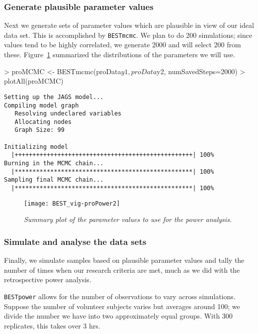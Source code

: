 \documentclass[a4paper]{article}
\begin{document}
\subsubsection{Generate plausible parameter values}
\label{subsec:proPower2}

Next we generate sets of parameter values which are plausible in view of our ideal data set. This is accomplished by \texttt{BESTmcmc}. We plan to do 200 simulations; since values tend to be highly correlated, we generate 2000 and will select 200 from these. Figure~\ref{fig:proPower2} summarized the distributions of the parameters we will use.

\begin{Schunk}
\begin{Sinput}
> proMCMC <- BESTmcmc(proData$y1, proData$y2, numSavedSteps=2000)  
> plotAll(proMCMC)
\end{Sinput}
\end{Schunk}
\begin{verbatim}
Setting up the JAGS model...
Compiling model graph
   Resolving undeclared variables
   Allocating nodes
   Graph Size: 99

Initializing model
  |++++++++++++++++++++++++++++++++++++++++++++++++++| 100%
Burning in the MCMC chain...
  |**************************************************| 100%
Sampling final MCMC chain...
  |**************************************************| 100%
\end{verbatim}
\begin{figure}[p]
  \centering
  \texttt{[image: BEST\_vig-proPower2]}
  \caption{\it Summary plot of the parameter values to use for the power analysis.}
  \label{fig:proPower2}
\end{figure}

\subsubsection{Simulate and analyse the data sets}
\label{subsec:proPower3}

Finally, we simulate samples based on plausible parameter values and tally the number of times when our research criteria are met, much as we did with the retrospective power analysis.

\texttt{BESTpower} allows for the number of observations to vary across simulations. Suppose the number of volunteer subjects varies but averages around 100; we divide the number we have into two approximately equal groups. With 300 replicates, this takes over 3 hrs.
\end{document}
